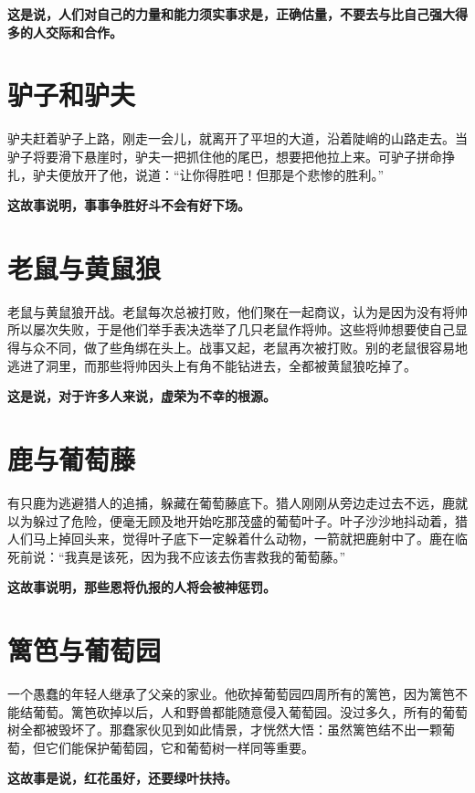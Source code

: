 {\bfseries \color{red}这是说，人们对自己的力量和能力须实事求是，正确估量，不要去与比自己强大得多的人交际和合作。}

\section{驴子和驴夫}

驴夫赶着驴子上路，刚走一会儿，就离开了平坦的大道，沿着陡峭的山路走去。当驴子将要滑下悬崖时，驴夫一把抓住他的尾巴，想要把他拉上来。可驴子拼命挣扎，驴夫便放开了他，说道：“让你得胜吧！但那是个悲惨的胜利。”

{\bfseries \color{red}这故事说明，事事争胜好斗不会有好下场。}

\section{老鼠与黄鼠狼}

老鼠与黄鼠狼开战。老鼠每次总被打败，他们聚在一起商议，认为是因为没有将帅所以屡次失败，于是他们举手表决选举了几只老鼠作将帅。这些将帅想要使自己显得与众不同，做了些角绑在头上。战事又起，老鼠再次被打败。别的老鼠很容易地逃进了洞里，而那些将帅因头上有角不能钻进去，全都被黄鼠狼吃掉了。

{\bfseries \color{red}这是说，对于许多人来说，虚荣为不幸的根源。}

\section{鹿与葡萄藤}

有只鹿为逃避猎人的追捕，躲藏在葡萄藤底下。猎人刚刚从旁边走过去不远，鹿就以为躲过了危险，便毫无顾及地开始吃那茂盛的葡萄叶子。叶子沙沙地抖动着，猎人们马上掉回头来，觉得叶子底下一定躲着什么动物，一箭就把鹿射中了。鹿在临死前说：“我真是该死，因为我不应该去伤害救我的葡萄藤。”

{\bfseries \color{red}这故事说明，那些恩将仇报的人将会被神惩罚。}

\section{篱笆与葡萄园}

一个愚蠢的年轻人继承了父亲的家业。他砍掉葡萄园四周所有的篱笆，因为篱笆不能结葡萄。篱笆砍掉以后，人和野兽都能随意侵入葡萄园。没过多久，所有的葡萄树全都被毁坏了。那蠢家伙见到如此情景，才恍然大悟：虽然篱笆结不出一颗葡萄，但它们能保护葡萄园，它和葡萄树一样同等重要。

{\bfseries \color{red}这故事是说，红花虽好，还要绿叶扶持。}

